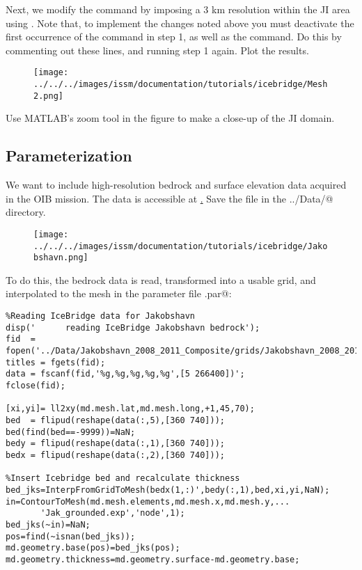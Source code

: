 Next, we modify the \verb@bamg@ command by imposing a 3 km resolution within the JI area using \verb@hmaxVertices@. Note that, to implement the changes noted above you must deactivate the first occurrence of the \verb@bamg@ command in step 1, as well as the \verb@return@ command. Do this by commenting out these lines, and running step 1 again. Plot the results.
\begin{figure}[H]
	\begin{center}
		\texttt{[image: ../../../images/issm/documentation/tutorials/icebridge/Mesh2.png]}
	\end{center}
\end{figure}
Use MATLAB's zoom tool in the figure to make a close-up of the JI domain.
\subsection{Parameterization} %
We want to include high-resolution bedrock and surface elevation data acquired in the OIB mission. The data is accessible at \href{http://data.cresis.ku.edu/data/grids/Jakobshavn_2008_2011_Composite_XYZGrid.txt}. Save the file in the \verb@../Data/@ directory.
\begin{figure}[H]
	\begin{center}
	\texttt{[image: ../../../images/issm/documentation/tutorials/icebridge/Jakobshavn.png]}
\end{center}
\end{figure}
To do this, the bedrock data is read, transformed into a usable grid, and interpolated to the mesh in the parameter file \verb@Greenland.par@:
\begin{verbatim}%Reading IceBridge data for Jakobshavn
disp('      reading IceBridge Jakobshavn bedrock');
fid  = fopen('../Data/Jakobshavn_2008_2011_Composite/grids/Jakobshavn_2008_2011_Composite_XYZGrid.txt');
titles = fgets(fid); 
data = fscanf(fid,'%g,%g,%g,%g,%g',[5 266400])';
fclose(fid);

[xi,yi]= ll2xy(md.mesh.lat,md.mesh.long,+1,45,70);
bed  = flipud(reshape(data(:,5),[360 740])); bed(find(bed==-9999))=NaN;
bedy = flipud(reshape(data(:,1),[360 740]));
bedx = flipud(reshape(data(:,2),[360 740]));

%Insert Icebridge bed and recalculate thickness
bed_jks=InterpFromGridToMesh(bedx(1,:)',bedy(:,1),bed,xi,yi,NaN);
in=ContourToMesh(md.mesh.elements,md.mesh.x,md.mesh.y,...
	   'Jak_grounded.exp','node',1);
bed_jks(~in)=NaN;
pos=find(~isnan(bed_jks));
md.geometry.base(pos)=bed_jks(pos);
md.geometry.thickness=md.geometry.surface-md.geometry.base;\end{verbatim}

